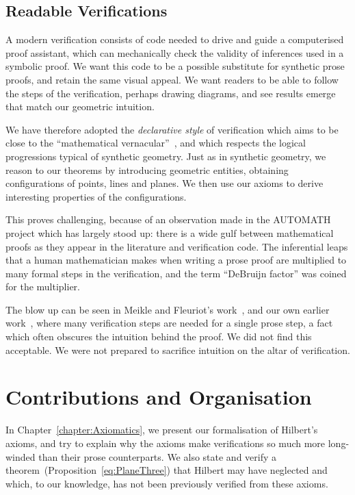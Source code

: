 \subsection{Readable Verifications}
A modern verification consists of code needed to drive and guide a computerised proof assistant, which can mechanically check the validity of inferences used in a symbolic proof. We want this code to be a possible substitute for synthetic prose proofs, and retain the same visual appeal. We want readers to be able to follow the steps of the verification, perhaps drawing diagrams, and see results emerge that match our geometric intuition.

We have therefore adopted the \emph{declarative style} of verification which aims to be close to the ``mathematical vernacular''~\cite{MizarMathematicalVernacular}, and which respects the logical progressions typical of synthetic geometry. Just as in synthetic geometry, we reason to our theorems by introducing geometric entities, obtaining configurations of points, lines and planes. We then use our axioms to derive interesting properties of the configurations.

This proves challenging, because of an observation made in the AUTOMATH project which has largely stood up: there is a wide gulf between mathematical proofs as they appear in the literature and verification code. The inferential leaps that a human mathematician makes when writing a prose proof are multiplied to many formal steps in the verification, and the term ``DeBruijn factor'' was coined for the multiplier. 

The blow up can be seen in Meikle and Fleuriot's work~\cite{MeikleFleuriotFormalizingHilbert}, and our own earlier work~\cite{ScottMScThesis}, where many verification steps are needed for a single prose step, a fact which often obscures the intuition behind the proof. We did not find this acceptable. We were not prepared to sacrifice intuition on the altar of verification.

\section{Contributions and Organisation}
In Chapter~\ref{chapter:Axiomatics}, we present our formalisation of Hilbert's axioms, and try to explain why the axioms make verifications so much more long-winded than their prose counterparts. We also state and verify a theorem~(Proposition~\ref{eq:PlaneThree}) that Hilbert may have neglected and which, to our knowledge, has not been previously verified from these axioms.

